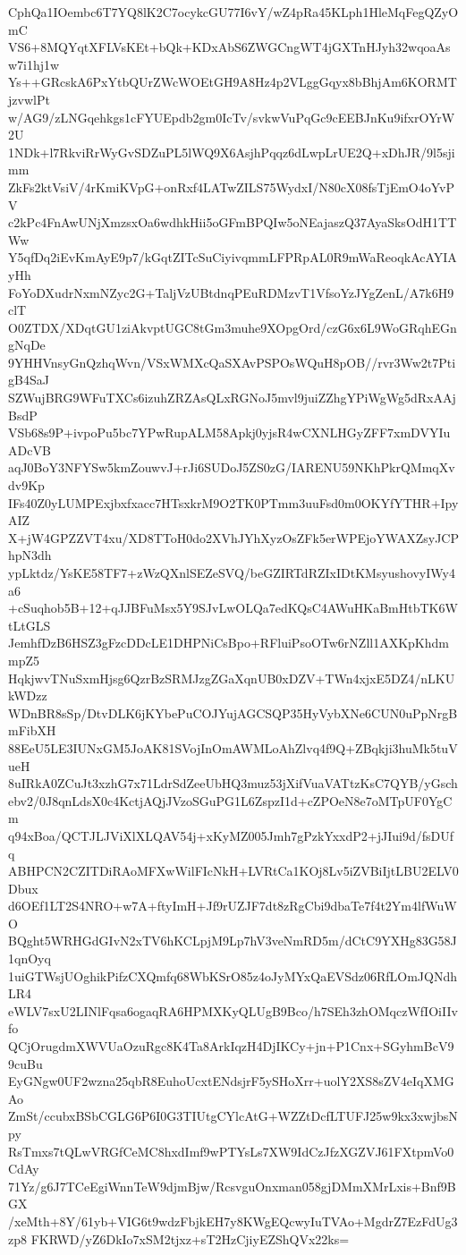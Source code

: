 CphQa1IOembc6T7YQ8lK2C7ocykcGU77I6vY/wZ4pRa45KLph1HleMqFegQZyOmC
VS6+8MQYqtXFLVsKEt+bQk+KDxAbS6ZWGCngWT4jGXTnHJyh32wqoaAsw7i1hj1w
Ys++GRcskA6PxYtbQUrZWcWOEtGH9A8Hz4p2VLggGqyx8bBhjAm6KORMTjzvwlPt
w/AG9/zLNGqehkgs1cFYUEpdb2gm0IcTv/svkwVuPqGc9cEEBJnKu9ifxrOYrW2U
1NDk+l7RkviRrWyGvSDZuPL5lWQ9X6AsjhPqqz6dLwpLrUE2Q+xDhJR/9l5sjimm
ZkFs2ktVsiV/4rKmiKVpG+onRxf4LATwZILS75WydxI/N80cX08fsTjEmO4oYvPV
c2kPc4FnAwUNjXmzsxOa6wdhkHii5oGFmBPQIw5oNEajaszQ37AyaSksOdH1TTWw
Y5qfDq2iEvKmAyE9p7/kGqtZITcSuCiyivqmmLFPRpAL0R9mWaReoqkAcAYIAyHh
FoYoDXudrNxmNZyc2G+TaljVzUBtdnqPEuRDMzvT1VfsoYzJYgZenL/A7k6H9clT
O0ZTDX/XDqtGU1ziAkvptUGC8tGm3muhe9XOpgOrd/czG6x6L9WoGRqhEGngNqDe
9YHHVnsyGnQzhqWvn/VSxWMXcQaSXAvPSPOsWQuH8pOB//rvr3Ww2t7PtigB4SaJ
SZWujBRG9WFuTXCs6izuhZRZAsQLxRGNoJ5mvl9juiZZhgYPiWgWg5dRxAAjBsdP
VSb68s9P+ivpoPu5bc7YPwRupALM58Apkj0yjsR4wCXNLHGyZFF7xmDVYIuADcVB
aqJ0BoY3NFYSw5kmZouwvJ+rJi6SUDoJ5ZS0zG/IARENU59NKhPkrQMmqXvdv9Kp
IFs40Z0yLUMPExjbxfxacc7HTsxkrM9O2TK0PTmm3uuFsd0m0OKYfYTHR+IpyAIZ
X+jW4GPZZVT4xu/XD8TToH0do2XVhJYhXyzOsZFk5erWPEjoYWAXZsyJCPhpN3dh
ypLktdz/YsKE58TF7+zWzQXnlSEZeSVQ/beGZIRTdRZIxIDtKMsyushovyIWy4a6
+cSuqhob5B+12+qJJBFuMsx5Y9SJvLwOLQa7edKQsC4AWuHKaBmHtbTK6WtLtGLS
JemhfDzB6HSZ3gFzcDDcLE1DHPNiCsBpo+RFluiPsoOTw6rNZll1AXKpKhdmmpZ5
HqkjwvTNuSxmHjsg6QzrBzSRMJzgZGaXqnUB0xDZV+TWn4xjxE5DZ4/nLKUkWDzz
WDnBR8sSp/DtvDLK6jKYbePuCOJYujAGCSQP35HyVybXNe6CUN0uPpNrgBmFibXH
88EeU5LE3IUNxGM5JoAK81SVojInOmAWMLoAhZlvq4f9Q+ZBqkji3huMk5tuVueH
8uIRkA0ZCuJt3xzhG7x71LdrSdZeeUbHQ3muz53jXifVuaVATtzKsC7QYB/yGsch
ebv2/0J8qnLdsX0c4KctjAQjJVzoSGuPG1L6ZspzI1d+cZPOeN8e7oMTpUF0YgCm
q94xBoa/QCTJLJViXlXLQAV54j+xKyMZ005Jmh7gPzkYxxdP2+jJIui9d/fsDUfq
ABHPCN2CZITDiRAoMFXwWilFIcNkH+LVRtCa1KOj8Lv5iZVBiIjtLBU2ELV0Dbux
d6OEf1LT2S4NRO+w7A+ftyImH+Jf9rUZJF7dt8zRgCbi9dbaTe7f4t2Ym4lfWuWO
BQght5WRHGdGIvN2xTV6hKCLpjM9Lp7hV3veNmRD5m/dCtC9YXHg83G58J1qnOyq
1uiGTWsjUOghikPifzCXQmfq68WbKSrO85z4oJyMYxQaEVSdz06RfLOmJQNdhLR4
eWLV7sxU2LINlFqsa6ogaqRA6HPMXKyQLUgB9Bco/h7SEh3zhOMqczWfIOiIIvfo
QCjOrugdmXWVUaOzuRgc8K4Ta8ArkIqzH4DjIKCy+jn+P1Cnx+SGyhmBcV99cuBu
EyGNgw0UF2wzna25qbR8EuhoUcxtENdsjrF5ySHoXrr+uolY2XS8sZV4eIqXMGAo
ZmSt/ccubxBSbCGLG6P6I0G3TIUtgCYlcAtG+WZZtDcfLTUFJ25w9kx3xwjbsNpy
RsTmxs7tQLwVRGfCeMC8hxdImf9wPTYsLs7XW9IdCzJfzXGZVJ61FXtpmVo0CdAy
71Yz/g6J7TCeEgiWnnTeW9djmBjw/RcsvguOnxman058gjDMmXMrLxis+Bnf9BGX
/xeMth+8Y/61yb+VIG6t9wdzFbjkEH7y8KWgEQcwyIuTVAo+MgdrZ7EzFdUg3zp8
FKRWD/yZ6DkIo7xSM2tjxz+sT2HzCjiyEZShQVx22ks=
